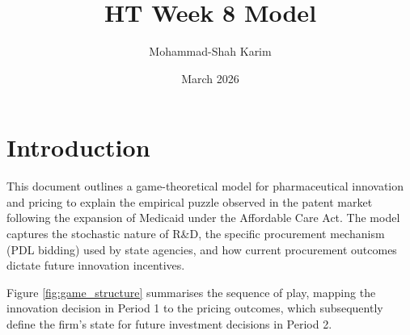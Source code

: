 \documentclass[12pt]{article}
\title{HT Week 8 Model}
\author{Mohammad-Shah Karim}
\date{March 2026}
\begin{document}
\maketitle

\tableofcontents

\newpage

\section{Introduction}

This document outlines a game-theoretical model for pharmaceutical innovation and pricing to explain the empirical puzzle observed in the patent market following the expansion of Medicaid under the Affordable Care Act. The model captures the stochastic nature of R\&D, the specific procurement mechanism (PDL bidding) used by state agencies, and how current procurement outcomes dictate future innovation incentives.

Figure \ref{fig:game_structure} summarises the sequence of play, mapping the innovation decision in Period 1 to the pricing outcomes, which subsequently define the firm's state for future investment decisions in Period 2.
\end{document}
